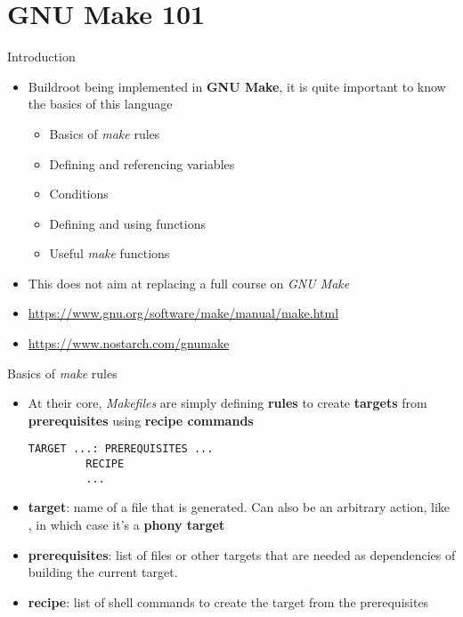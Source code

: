 \section{GNU Make 101}

\begin{frame}{Introduction}
  \begin{itemize}
  \item Buildroot being implemented in {\bf GNU Make}, it is quite
    important to know the basics of this language
    \begin{itemize}
    \item Basics of {\em make} rules
    \item Defining and referencing variables
    \item Conditions
    \item Defining and using functions
    \item Useful {\em make} functions
    \end{itemize}
  \item This does not aim at replacing a full course on {\em GNU Make}
  \item \url{https://www.gnu.org/software/make/manual/make.html}
  \item \url{https://www.nostarch.com/gnumake}
  \end{itemize}
\end{frame}

\begin{frame}[fragile]{Basics of {\em make} rules}
  \begin{itemize}
  \item At their core, {\em Makefiles} are simply defining {\bf rules}
    to create {\bf targets} from {\bf prerequisites} using {\bf recipe
      commands}
    \begin{block}{}
\begin{verbatim}
TARGET ...: PREREQUISITES ...
         RECIPE
         ...
\end{verbatim}
    \end{block}
  \item {\bf target}: name of a file that is generated. Can also be an
    arbitrary action, like , in which case it's a {\bf
      phony target}
  \item {\bf prerequisites}: list of files or other targets that are
    needed as dependencies of building the current target.
  \item {\bf recipe}: list of shell commands to create the target from
    the prerequisites
  \end{itemize}
\end{frame}

